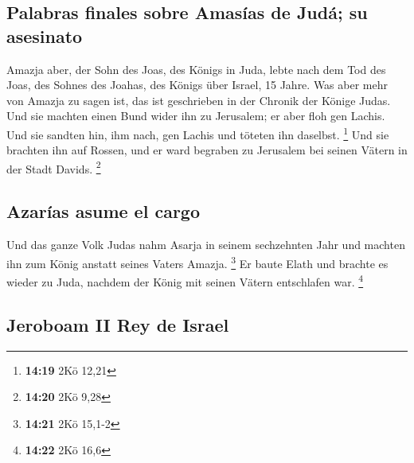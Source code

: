 \hypertarget{palabras-finales-sobre-amasuxedas-de-juduxe1-su-asesinato}{%
\subsection{Palabras finales sobre Amasías de Judá; su
asesinato}\label{palabras-finales-sobre-amasuxedas-de-juduxe1-su-asesinato}}

 Amazja aber, der Sohn des Joas, des Königs in Juda,
lebte nach dem Tod des Joas, des Sohnes des Joahas, des Königs über
Israel, 15 Jahre.  Was aber mehr von Amazja zu sagen ist,
das ist geschrieben in der Chronik der Könige Judas.  Und
sie machten einen Bund wider ihn zu Jerusalem; er aber floh gen Lachis.
Und sie sandten hin, ihm nach, gen Lachis und töteten ihn daselbst.
\footnote{\textbf{14:19} 2Kö 12,21}  Und sie brachten ihn
auf Rossen, und er ward begraben zu Jerusalem bei seinen Vätern in der
Stadt Davids. \footnote{\textbf{14:20} 2Kö 9,28}

\hypertarget{azaruxedas-asume-el-cargo}{%
\subsection{Azarías asume el cargo}\label{azaruxedas-asume-el-cargo}}

 Und das ganze Volk Judas nahm Asarja in seinem
sechzehnten Jahr und machten ihn zum König anstatt seines Vaters Amazja.
\footnote{\textbf{14:21} 2Kö 15,1-2}  Er baute Elath und
brachte es wieder zu Juda, nachdem der König mit seinen Vätern
entschlafen war. \footnote{\textbf{14:22} 2Kö 16,6}

\hypertarget{jeroboam-ii-rey-de-israel}{%
\subsection{Jeroboam II Rey de Israel}\label{jeroboam-ii-rey-de-israel}}

